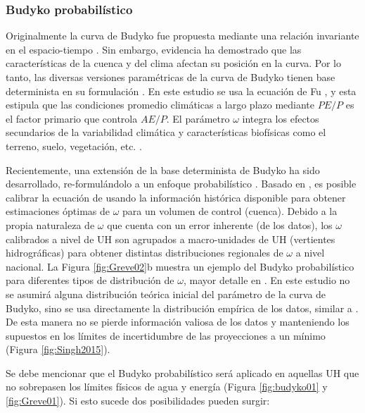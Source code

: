\documentclass[12pt]{article}
\begin{document}
\subsubsection{Budyko probabilístico}

Originalmente la curva de Budyko fue propuesta mediante una relación invariante en el espacio-tiempo \citep{schreiber1904relationship,ol1911evaporation,budyko1958heat}. Sin embargo, evidencia ha demostrado que las características de la cuenca y del clima afectan su posición en la curva. Por lo tanto, las diversas versiones paramétricas de la curva de Budyko tienen base determinista en su formulación \citep{Fu1981,Koster1999,zhang2001response,zhou2015complementary,Wang2014,Zhang2004,Zhang2008,fathi2019new}. En este estudio se usa la ecuación de Fu \citep[Ecuación \ref{equ:fuEqu} y Figura \ref{fig:Greve01};][]{Fu1981}, y esta estipula que las condiciones promedio climáticas a largo plazo mediante $PE/P$ es el factor primario que controla $AE/P$. El parámetro $\omega$ integra los efectos secundarios de la variabilidad climática y características biofísicas como el terreno, suelo, vegetación, etc. \citep{Gentine2012,Berghuijs2014,Greve2015}.

Recientemente, una extensión de la base determinista de Budyko ha sido desarrollado, re-formulándolo a un enfoque probabilístico \citep{Greve2015}. Basado en \citet{Greve2015}, es posible calibrar la ecuación de \cite{Fu1981} usando la información histórica disponible para obtener estimaciones óptimas de $\omega$ para un volumen de control (cuenca). Debido a la propia naturaleza de $\omega$ que cuenta con un error inherente (de los datos), los $\omega$ calibrados a nivel de UH son agrupados a macro-unidades de UH (vertientes hidrográficas) para obtener distintas distribuciones regionales de $\omega$ a nivel nacional. La Figura \ref{fig:Greve02}b muestra un ejemplo del Budyko probabilístico para diferentes tipos de distribución de $\omega$, mayor detalle en \citet{Greve2015}. En este estudio no se asumirá alguna distribución teórica inicial del parámetro de la curva de Budyko, sino se usa directamente la distribución empírica de los datos, similar a \citet{Singh2015}. De esta manera no se pierde información valiosa de los datos y manteniendo los supuestos en los límites de incertidumbre de las proyecciones a un mínimo (Figura \ref{fig:Singh2015}).

Se debe mencionar que el Budyko probabilístico será aplicado en aquellas UH que no sobrepasen los límites físicos de agua y energía (Figura \ref{fig:budyko01} y \ref{fig:Greve01}). Si esto sucede dos posibilidades pueden surgir: 
\end{document}
